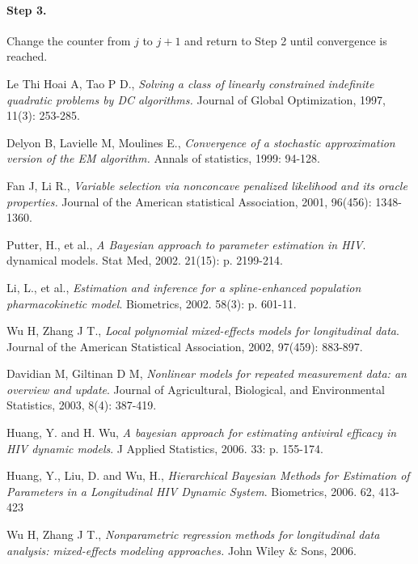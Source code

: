\documentclass[12pt]{extarticle}
\begin{document}
\paragraph{Step 3.}
Change the counter from $j$ to $j+1$ and return to Step 2 until convergence is reached.

\begin{thebibliography}{9}

Le Thi Hoai A, Tao P D., 
\emph{Solving a class of linearly constrained indefinite quadratic problems by DC algorithms.} 
Journal of Global Optimization, 1997, 11(3): 253-285.

Delyon B, Lavielle M, Moulines E., 
\emph{Convergence of a stochastic approximation version of the EM algorithm.} 
Annals of statistics, 1999: 94-128.

Fan J, Li R.,
\emph{Variable selection via nonconcave penalized likelihood and its oracle properties.} 
Journal of the American statistical Association, 2001, 96(456): 1348-1360.

Putter, H., et al., 
\emph{A Bayesian approach to parameter estimation in HIV}. 
dynamical models. Stat Med, 2002. 21(15): p. 2199-214.

Li, L., et al., 
\emph{Estimation and inference for a spline-enhanced population pharmacokinetic model}. 
Biometrics, 2002. 58(3): p. 601-11.

Wu H, Zhang J T., 
\emph{Local polynomial mixed-effects models for longitudinal data}. 
Journal of the American Statistical Association, 2002, 97(459): 883-897.

Davidian M, Giltinan D M, 
\emph{Nonlinear models for repeated measurement data: an overview and update}. 
Journal of Agricultural, Biological, and Environmental Statistics, 2003, 8(4): 387-419.

Huang, Y. and H. Wu, 
\emph{A bayesian approach for estimating antiviral efficacy in HIV dynamic models}. 
J Applied Statistics, 2006. 33: p. 155-174.

Huang, Y., Liu, D. and Wu, H., 
\emph{Hierarchical Bayesian Methods for Estimation of Parameters in a Longitudinal HIV Dynamic System}. 
Biometrics, 2006. 62, 413-423

Wu H, Zhang J T., 
\emph{Nonparametric regression methods for longitudinal data analysis: mixed-effects modeling approaches.} 
John Wiley \& Sons, 2006.


\end{thebibliography}
\end{document}
